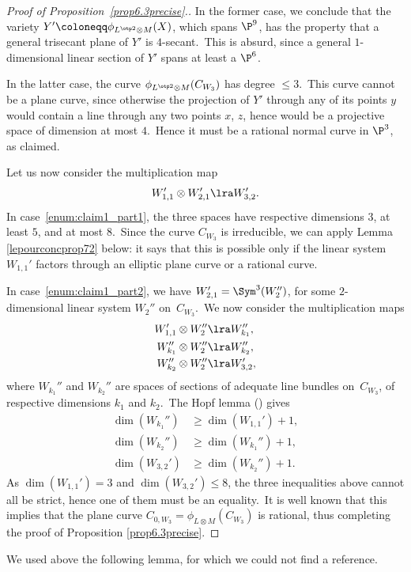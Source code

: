 \begin{proof}[Proof of Proposition~\ref{prop6.3precise}.]
In the former case, we conclude that the variety $Y'\coloneqq\phi_{L^{\otp 2}\otimes M}(X)$, which spans $\P^9$, has the property that a general trisecant plane of $Y'$ is $4$-secant.\
This is absurd, since a general $1$-dimensional linear section of $Y'$ spans at least a $\P^6$.\

In the latter case, the curve $\phi_{L^{\otp 2}\otimes M}(C_{W_3})$ has  degree $\leq 3$.\
This curve cannot be a plane curve, since otherwise the projection of $Y'$ through any of its points $y$ would contain a line through any two points $x$, $z$, hence would be a projective space of dimension at most $4$.\
Hence it must be a rational normal curve in $\P^3$, as claimed.

Let us now consider the multiplication map
\[
W_{1,1}'\otimes W_{2,1}'\lra  W_{3,2}'.
\]
In case~\ref{enum:claim1_part1}, the three spaces have respective dimensions $3$, at least $5$, and at most $8$.\
Since the curve $C_{W_3}$ is irreducible, we can apply Lemma \ref{lepourconcprop72} below: it says that   this is possible only if the linear system $W_{1,1}'$ factors through an elliptic plane  curve  or  a rational curve.

In case~\ref{enum:claim1_part2}, we have $W_{2,1}'=\Sym^3(W_2'')$, for some $2$-dimensional linear system $W_2''$ on~$C_{W_3}$.\
We now consider the multiplication maps
\begin{align*}
W_{1,1}'\otimes W_2''&\lra  W_{k_1}'',\\
W_{k_1}''\otimes W_2''&\lra  W_{k_2}'',\\
W_{k_2}''\otimes W_2''&\lra  W_{3,2}',
\end{align*}
where $W_{k_1}''$ and $W_{k_2}''$ are spaces of sections of adequate line bundles on~$C_{W_3}$, of respective dimensions $k_1$ and $k_2$.\
The Hopf lemma (\cite[p.~108]{acgh}) gives
\begin{align*}
\dim (W_{k_1}'')&\geq \dim (W_{1,1}')+1,\\
\dim (W_{k_2}'')&\geq \dim (W_{k_1}'')+1,\\
\dim (W_{3,2}')&\geq \dim (W_{k_2}'')+1.
\end{align*}
As $\dim (W_{1,1}')=3$ and $\dim (W_{3,2}')\leq 8$, the three inequalities above cannot all be strict, hence one of them must be an equality.\
It is well known that this implies  that the plane curve $C_{0,W_3}=\phi_{L\otimes M}(C_{W_3}) $ is rational, thus completing the proof of Proposition \ref{prop6.3precise}.
\end{proof}

We used  above the following lemma, for which we could not find a reference.


